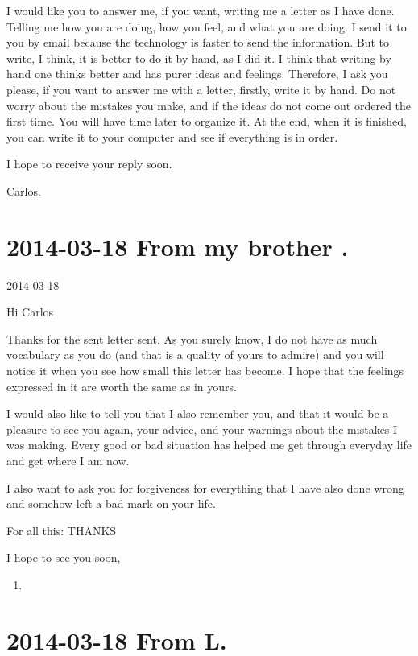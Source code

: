 \documentclass[]{book}
\begin{document}
I would like you to answer me, if you want, writing me a letter as I have done. Telling me how you are doing, how you feel, and what you are doing. I send it to you by email because the technology is faster to send the information. But to write, I think, it is better to do it by hand, as I did it. I think that writing by hand one thinks better and has purer ideas and feelings. Therefore, I ask you please, if you want to answer me with a letter, firstly, write it by hand. Do not worry about the mistakes you make, and if the ideas do not come out ordered the first time. You will have time later to organize it. At the end, when it is finished, you can write it to your computer and see if everything is in order.

I hope to receive your reply soon.

Carlos.

\hypertarget{frombrther20140318}{%
\section*{2014-03-18 From my brother .}\label{frombrther20140318}}

2014-03-18

Hi Carlos

Thanks for the sent letter sent. As you surely know, I do not have as much vocabulary as you do (and that is a quality of yours to admire) and you will notice it when you see how small this letter has become. I hope that the feelings expressed in it are worth the same as in yours.

I would also like to tell you that I also remember you, and that it would be a pleasure to see you again, your advice, and your warnings about the mistakes I was making. Every good or bad situation has helped me get through everyday life and get where I am now.

I also want to ask you for forgiveness for everything that I have also done wrong and somehow left a bad mark on your life.

For all this: THANKS

I hope to see you soon,

\begin{enumerate}
\def\labelenumi{\Alph{enumi}.}
\setcounter{enumi}{3}
\item
\end{enumerate}

\hypertarget{fromL20140318}{%
\section*{2014-03-18 From L.}\label{fromL20140318}}
\end{document}
